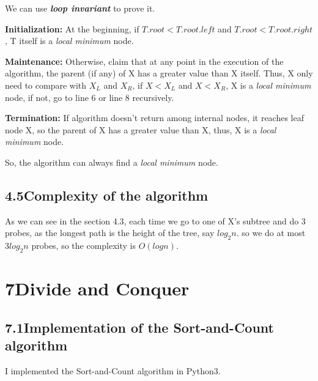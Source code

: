 \documentclass[a4paper,12pt]{article}
\begin{document}
We can use \textbf{\textit{loop invariant}} to prove it.

\textbf{Initialization:} At the beginning, if $T.root<T.root.left$ and $T.root<T.root.right$, T itself is a \textit{local minimum} node.

\textbf{Maintenance:} Otherwise, claim that at any point in the execution of the algorithm, the parent (if any) of X has a greater value than X itself. Thus, X only need to compare with $X_L$ and $X_R$, if $X<X_L$ and $X<X_R$, X is a \textit{local minimum} node, if not, go to line 6 or line 8 recursively.

\textbf{Termination:} If algorithm doesn't return among internal nodes, it reaches leaf node X, so the parent of X has a greater value than X, thus, X is a \textit{local minimum} node.

So, the algorithm can always find a \textit{local minimum} node.

\subsection*{\textnormal{4.5\quad Complexity of the algorithm}}

As we can see in the section 4.3, each time we go to one of X's subtree and do 3 probes, as the longest path is the height of the tree, say $log_2n$. so we do at most $3log_2n$ probes, so the complexity is $O(logn)$.

\section*{7\quad Divide and Conquer}
\subsection*{\textnormal{7.1\quad Implementation of the Sort-and-Count algorithm}}

I implemented the Sort-and-Count algorithm in Python3.
\end{document}

